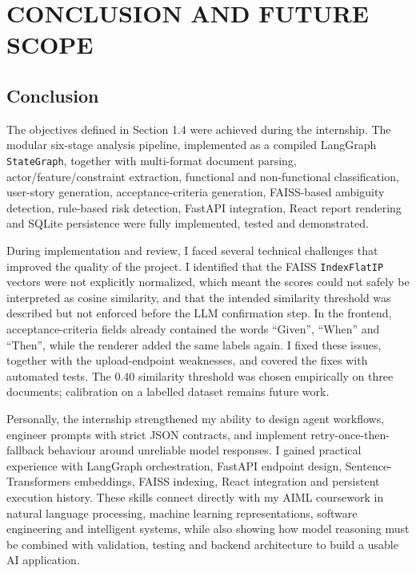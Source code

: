 

\pagestyle{fancy}

\setcounter{page}{14}
\setcounter{chapter}{5}\setcounter{section}{0}\setcounter{table}{0}\setcounter{figure}{0}
\chapter{CONCLUSION AND FUTURE SCOPE}

\section{Conclusion}
The objectives defined in Section 1.4 were achieved during the internship.
The modular six-stage analysis pipeline, implemented as a compiled
LangGraph \texttt{StateGraph}, together with multi-format document parsing,
actor/feature/constraint extraction, functional and non-functional
classification, user-story generation, acceptance-criteria generation,
FAISS-based ambiguity detection, rule-based risk detection, FastAPI
integration, React report rendering and SQLite persistence were fully
implemented, tested and demonstrated.

During implementation and review, I faced several technical challenges
that improved the quality of the project. I identified that the FAISS
\texttt{IndexFlatIP} vectors were not explicitly normalized, which meant
the scores could not safely be interpreted as cosine similarity, and that
the intended similarity threshold was described but not enforced before the
LLM confirmation step. In the frontend, acceptance-criteria fields already
contained the words ``Given'', ``When'' and ``Then'', while the renderer
added the same labels again. I fixed these issues, together with the
upload-endpoint weaknesses, and covered the fixes with automated tests.
The 0.40 similarity threshold was chosen empirically on three documents;
calibration on a labelled dataset remains future work.

Personally, the internship strengthened my ability to design agent
workflows, engineer prompts with strict JSON contracts, and implement
retry-once-then-fallback behaviour around unreliable model responses. I
gained practical experience with LangGraph orchestration, FastAPI endpoint
design, Sentence-Transformers embeddings, FAISS indexing, React integration
and persistent execution history. These skills connect directly with my
AIML coursework in natural language processing, machine learning
representations, software engineering and intelligent systems, while also
showing how model reasoning must be combined with validation, testing and
backend architecture to build a usable AI application.

